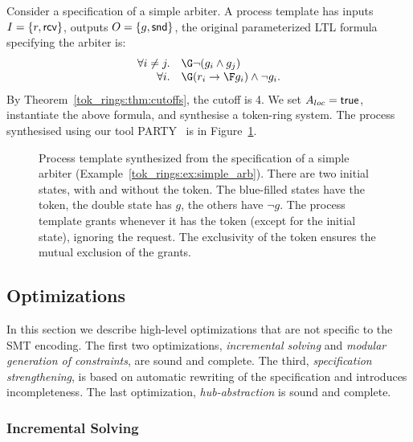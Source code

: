 \begin{example}\label{tok_rings:ex:simple_arb}
Consider a specification of a simple arbiter.
A process template has inputs $I=\{r,\mathsf{rcv}\}$, outputs $O=\{g,\mathsf{snd}\}$,
the original parameterized LTL formula specifying the arbiter is:
$$
\begin{array}{rl}
  \forall i \neq j. & \G \neg ( g_i \land g_j ) \\
         \forall i. & \G (r_i \impl \F g_i) \land \neg g_i.
  \end{array}
$$
By Theorem~\ref{tok_rings:thm:cutoffs}, the cutoff is 4.
We set $A_{loc}=\textsf{true}$, instantiate the above formula, and synthesise a token-ring system.
The process synthesised using our tool PARTY~\cite{party} is in Figure~\ref{tok_rings:fig:simple_arb}.

\begin{figure}[tb]\center

\caption{Process template synthesized from the specification of a simple arbiter
 (Example~\ref{tok_rings:ex:simple_arb}).
 There are two initial states, with and without the token.
 The blue-filled states have the token,
 the double state has $g$, the others have $\neg g$.
 The process template grants whenever it has the token (except for the initial state),
 ignoring the request.
 The exclusivity of the token ensures the mutual exclusion of the grants.}
\label{tok_rings:fig:simple_arb}
\end{figure}
\end{example}


\subsection{Optimizations} \label{tok_rings:sec:optimizations}

In this section we describe high-level optimizations that are not specific to the SMT encoding.
The first two optimizations, \emph{incremental solving} and \emph{modular generation of constraints},
are sound and complete.
The third, \emph{specification strengthening},
is based on automatic rewriting of the specification and introduces incompleteness.
The last optimization, \emph{hub-abstraction} is sound and complete.

\subsubsection{Incremental Solving}

